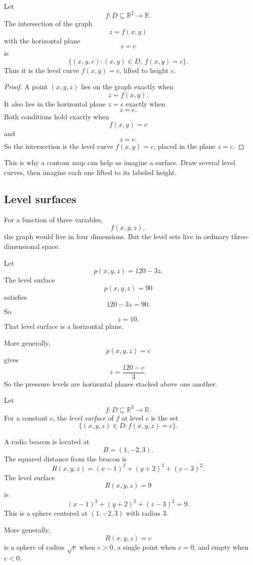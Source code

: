 \begin{theorem}
Let
\[
    f:D\subseteq\mathbb R^2\to\mathbb R.
\]
The intersection of the graph
\[
    z=f(x,y)
\]
with the horizontal plane
\[
    z=c
\]
is
\[
    \{(x,y,c):(x,y)\in D,\ f(x,y)=c\}.
\]
Thus it is the level curve \(f(x,y)=c\), lifted to height \(c\).
\end{theorem}

\begin{proof}
A point \((x,y,z)\) lies on the graph exactly when
\[
    z=f(x,y).
\]
It also lies in the horizontal plane \(z=c\) exactly when
\[
    z=c.
\]
Both conditions hold exactly when
\[
    f(x,y)=c
\]
and
\[
    z=c.
\]
So the intersection is the level curve \(f(x,y)=c\), placed in the plane \(z=c\).
\end{proof}

This is why a contour map can help us imagine a surface.  Draw several level curves,
then imagine each one lifted to its labeled height.

\subsection{Level surfaces}

For a function of three variables,
\[
    f(x,y,z),
\]
the graph would live in four dimensions.  But the level sets live in ordinary
three-dimensional space.

\begin{example}
Let
\[
    p(x,y,z)=120-3z.
\]
The level surface
\[
    p(x,y,z)=90
\]
satisfies
\[
    120-3z=90.
\]
So
\[
    z=10.
\]
That level surface is a horizontal plane.

More generally,
\[
    p(x,y,z)=c
\]
gives
\[
    z=\frac{120-c}{3}.
\]
So the pressure levels are horizontal planes stacked above one another.
\end{example}

\begin{definition}
Let
\[
    f:D\subseteq\mathbb R^3\to\mathbb R.
\]
For a constant \(c\), the \emph{level surface} of \(f\) at level \(c\) is the set
\[
\boxed{
    \{(x,y,z)\in D:f(x,y,z)=c\}.
}
\]
\end{definition}

\begin{example}
A radio beacon is located at
\[
    B=(1,-2,3).
\]
The squared distance from the beacon is
\[
    R(x,y,z)=(x-1)^2+(y+2)^2+(z-3)^2.
\]
The level surface
\[
    R(x,y,z)=9
\]
is
\[
    (x-1)^2+(y+2)^2+(z-3)^2=9.
\]
This is a sphere centered at \((1,-2,3)\) with radius \(3\).

More generally,
\[
    R(x,y,z)=c
\]
is a sphere of radius \(\sqrt c\) when \(c>0\), a single point when \(c=0\), and empty
when \(c<0\).
\end{example}

